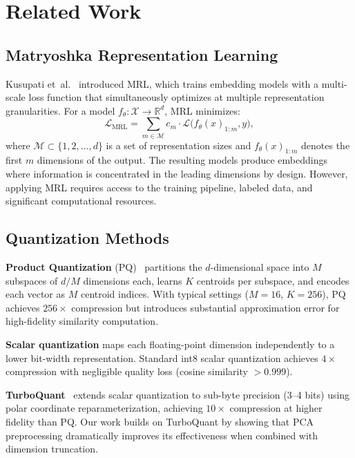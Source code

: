 \documentclass[journal]{IEEEtran}
\newcommand{\R}{\mathbb{R}}
\begin{document}
\section{Related Work}
\label{sec:related}

\subsection{Matryoshka Representation Learning}

Kusupati et~al.~\cite{kusupati2022matryoshka} introduced MRL, which trains embedding models with a multi-scale loss function that simultaneously optimizes at multiple representation granularities.
For a model $f_\theta: \mathcal{X} \rightarrow \R^d$, MRL minimizes:
\begin{equation}
  \mathcal{L}_{\text{MRL}} = \sum_{m \in \mathcal{M}} c_m \cdot \mathcal{L}\bigl(f_\theta(x)_{1:m}, y\bigr),
  \label{eq:mrl}
\end{equation}
where $\mathcal{M} \subset \{1, 2, \ldots, d\}$ is a set of representation sizes and $f_\theta(x)_{1:m}$ denotes the first $m$ dimensions of the output.
The resulting models produce embeddings where information is concentrated in the leading dimensions by design.
However, applying MRL requires access to the training pipeline, labeled data, and significant computational resources.

\subsection{Quantization Methods}

\textbf{Product Quantization} (PQ)~\cite{jegou2011product,ge2014optimized} partitions the $d$-dimensional space into $M$ subspaces of $d/M$ dimensions each, learns $K$ centroids per subspace, and encodes each vector as $M$ centroid indices.
With typical settings ($M=16$, $K=256$), PQ achieves $256\times$ compression but introduces substantial approximation error for high-fidelity similarity computation.

\textbf{Scalar quantization} maps each floating-point dimension independently to a lower bit-width representation.
Standard int8 scalar quantization achieves $4\times$ compression with negligible quality loss (cosine similarity $> 0.999$).

\textbf{TurboQuant}~\cite{zandieh2026turboquant} extends scalar quantization to sub-byte precision (3--4 bits) using polar coordinate reparameterization, achieving $10\times$ compression at higher fidelity than PQ.
Our work builds on TurboQuant by showing that PCA preprocessing dramatically improves its effectiveness when combined with dimension truncation.
\end{document}
